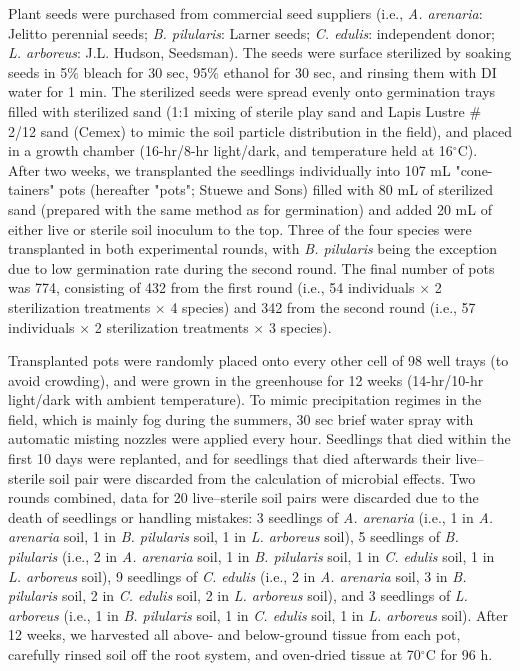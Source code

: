 Plant seeds were purchased from commercial seed suppliers (i.e., \textit{A. arenaria}: Jelitto perennial seeds; \textit{B. pilularis}: Larner seeds; \textit{C. edulis}: independent donor; \textit{L. arboreus}: J.L. Hudson, Seedsman). The seeds were surface sterilized by soaking seeds in 5$\%$ bleach for 30 sec, 95$\%$ ethanol for 30 sec, and rinsing them with DI water for 1 min. The sterilized seeds were spread evenly onto germination trays filled with sterilized sand (1:1 mixing of sterile play sand and Lapis Lustre $\#$ 2/12 sand (Cemex) to mimic the soil particle distribution in the field), and placed in a growth chamber (16-hr/8-hr light/dark, and temperature held at 16$^\circ$C). After two weeks, we transplanted the seedlings individually into 107 mL "cone-tainers" pots (hereafter "pots"; Stuewe and Sons) filled with 80 mL of sterilized sand (prepared with the same method as for germination) and added 20 mL of either live or sterile soil inoculum to the top. Three of the four species were transplanted in both experimental rounds, with \textit{B. pilularis} being the exception due to low germination rate during the second round. The final number of pots was 774, consisting of 432 from the first round (i.e., 54 individuals $\times$ 2 sterilization treatments $\times$ 4 species) and 342 from the second round (i.e., 57 individuals $\times$ 2 sterilization treatments $\times$ 3 species).
\par

 
Transplanted pots were randomly placed onto every other cell of 98 well trays (to avoid crowding), and were grown in the greenhouse for 12 weeks (14-hr/10-hr light/dark with ambient temperature). To mimic precipitation regimes in the field, which is mainly fog during the summers, 30 sec brief water spray with automatic misting nozzles were applied every hour. Seedlings that died within the first 10 days were replanted, and for seedlings that died afterwards their live--sterile soil pair were discarded from the calculation of microbial effects. Two rounds combined, data for 20 live--sterile soil pairs were discarded due to the death of seedlings or handling mistakes: 3 seedlings of \textit{A. arenaria} (i.e., 1 in \textit{A. arenaria} soil, 1 in \textit{B. pilularis} soil, 1 in \textit{L. arboreus} soil), 5 seedlings of \textit{B. pilularis} (i.e., 2 in \textit{A. arenaria} soil, 1 in \textit{B. pilularis} soil, 1 in \textit{C. edulis} soil, 1 in \textit{L. arboreus} soil), 9 seedlings of \textit{C. edulis} (i.e., 2 in \textit{A. arenaria} soil, 3 in \textit{B. pilularis} soil, 2 in \textit{C. edulis} soil, 2 in \textit{L. arboreus} soil), and 3 seedlings of \textit{L. arboreus} (i.e., 1 in \textit{B. pilularis} soil, 1 in \textit{C. edulis} soil, 1 in \textit{L. arboreus} soil). After 12 weeks, we harvested all above- and below-ground tissue from each pot, carefully rinsed soil off the root system, and oven-dried tissue at 70$^{\circ}$C for 96 h. 
\par



